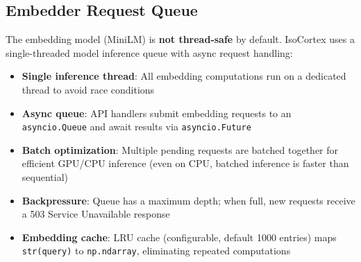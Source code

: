 \documentclass[11pt,a4paper]{article}
\newcommand{\inlinecode}[1]{\texttt{\small\colorbox{ctCodeBg}{#1}}}
\begin{document}
\subsection{Embedder Request Queue}

The embedding model (MiniLM) is \textbf{not thread-safe} by default. IsoCortex uses a single-threaded model inference queue with async request handling:

\begin{itemize}
    \item \textbf{Single inference thread}: All embedding computations run on a dedicated thread to avoid race conditions
    \item \textbf{Async queue}: API handlers submit embedding requests to an \inlinecode{asyncio.Queue} and await results via \inlinecode{asyncio.Future}
    \item \textbf{Batch optimization}: Multiple pending requests are batched together for efficient GPU/CPU inference (even on CPU, batched inference is faster than sequential)
    \item \textbf{Backpressure}: Queue has a maximum depth; when full, new requests receive a 503 Service Unavailable response
    \item \textbf{Embedding cache}: LRU cache (configurable, default 1000 entries) maps \inlinecode{str(query)} to \inlinecode{np.ndarray}, eliminating repeated computations
\end{itemize}
\end{document}
